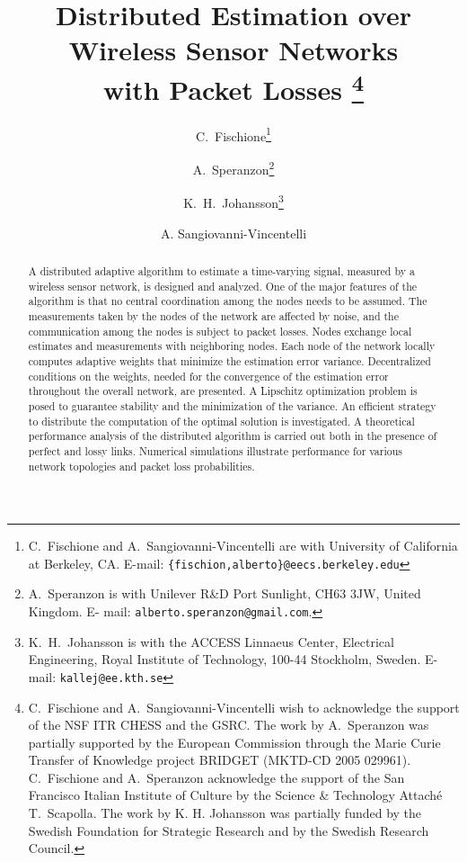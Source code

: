 \documentclass[a4paper,notitlepage,onecolumn]{article}
\numberwithin{equation}{section}
\begin{document}
\title{Distributed Estimation over Wireless Sensor Networks\\ with Packet Losses
\thanks{C.~Fischione and A.~Sangiovanni-Vincentelli wish to acknowledge the
support of the NSF ITR CHESS and the GSRC. The work by A.~Speranzon
was partially supported by the European Commission through the Marie
Curie Transfer of Knowledge project BRIDGET (MKTD-CD 2005 029961).
C.~Fischione and A.~Speranzon acknowledge the support of the San
Francisco Italian Institute of Culture by the Science \&
Technology Attach\'e T.~Scapolla. The work by K. H. Johansson was partially funded by the Swedish Foundation for Strategic Research and by the Swedish Research Council.}}
\author{C.~Fischione\thanks{C.~Fischione and A.~Sangiovanni-Vincentelli are with University of California at Berkeley, CA. E-mail:
\texttt{\{fischion,alberto\}@eecs.berkeley.edu}} \and A.~Speranzon\thanks{A.~Speranzon is
with Unilever R\&D Port Sunlight, CH63 3JW, United Kingdom. E- mail:
\texttt{alberto.speranzon@gmail.com}.} \and K.~H.~Johansson\thanks{K.~H.~Johansson is with the
ACCESS Linnaeus Center, Electrical Engineering, Royal Institute of Technology, 100-44 Stockholm, Sweden. E-mail: \texttt{kallej@ee.kth.se}}\and A. Sangiovanni-Vincentelli}

\maketitle
\begin{abstract}
A distributed adaptive algorithm to estimate a time-varying
signal, measured by a wireless sensor network, is designed and
analyzed. One of the major features of the algorithm is that no
central coordination among the nodes needs to be assumed. The
measurements taken by the nodes of the network are affected by
noise, and the communication among the nodes is subject to packet
losses. Nodes exchange local estimates and measurements with
neighboring nodes. Each node of the network locally computes
adaptive weights that minimize the estimation error variance.
Decentralized conditions on the weights, needed for the
convergence of the estimation error throughout the overall
network, are presented. A Lipschitz optimization problem is posed
to guarantee stability and the minimization of the variance. An
efficient strategy to distribute the computation of the optimal
solution is investigated. A theoretical performance analysis of
the distributed algorithm is carried out both in the presence of
perfect and lossy links. Numerical simulations illustrate
performance for various network topologies and packet loss
probabilities.
\end{abstract}
\end{document}
